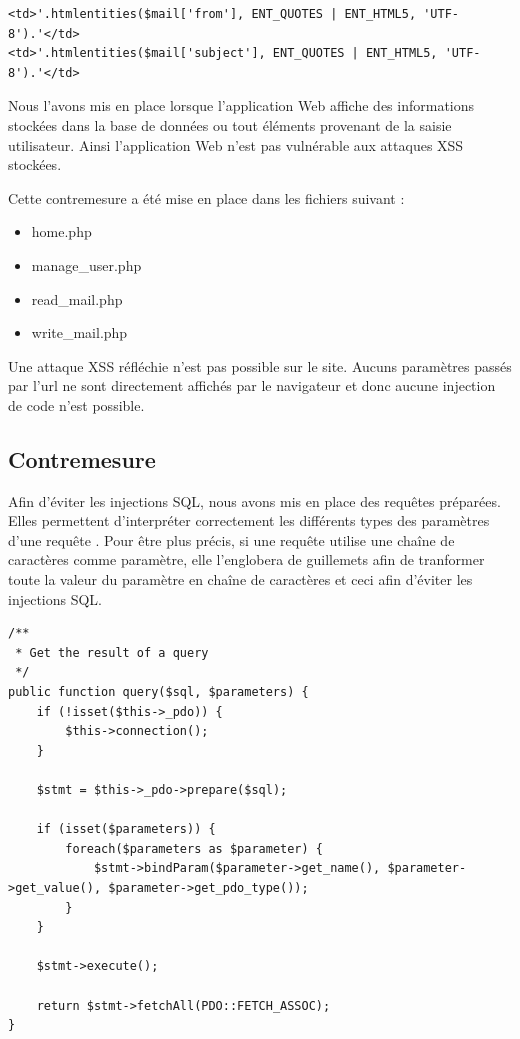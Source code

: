 \documentclass[12pt]{article}
\begin{document}
\begin{lstlisting}[style=JAVA]
<td>'.htmlentities($mail['from'], ENT_QUOTES | ENT_HTML5, 'UTF-8').'</td>
<td>'.htmlentities($mail['subject'], ENT_QUOTES | ENT_HTML5, 'UTF-8').'</td>
\end{lstlisting}

Nous l'avons mis en place lorsque l'application Web affiche des informations stockées dans la base de données ou tout éléments provenant de la saisie utilisateur. Ainsi l'application Web n'est pas vulnérable aux attaques XSS stockées.

Cette contremesure a été mise en place dans les fichiers suivant :

\begin{itemize}
\item home.php
\item manage\_user.php
\item read\_mail.php
\item write\_mail.php
\end{itemize}

Une attaque XSS réfléchie n'est pas possible sur le site. Aucuns paramètres passés par l'url ne sont directement affichés par le navigateur et donc aucune injection de code n'est possible.

\newpage
\subsection{Contremesure}\label{c3}

Afin d'éviter les injections SQL, nous avons mis en place des requêtes préparées. Elles permettent d'interpréter correctement les différents types des paramètres d'une requête . Pour être plus précis, si une requête utilise une chaîne de caractères comme paramètre, elle l'englobera de guillemets afin de tranformer toute la valeur du paramètre en chaîne de caractères et ceci afin d'éviter les injections SQL.

\begin{lstlisting}[style=JAVA]
/**
 * Get the result of a query
 */
public function query($sql, $parameters) {
    if (!isset($this->_pdo)) {
        $this->connection();
    }

    $stmt = $this->_pdo->prepare($sql);
    
    if (isset($parameters)) {
        foreach($parameters as $parameter) {
            $stmt->bindParam($parameter->get_name(), $parameter->get_value(), $parameter->get_pdo_type());
        }
    }

    $stmt->execute();

    return $stmt->fetchAll(PDO::FETCH_ASSOC);
}
\end{lstlisting}
\end{document}
